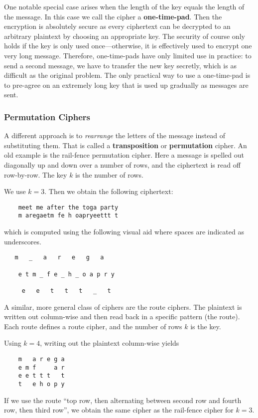 One notable special case arises when the length of the key equals the length of the message.
In this case we call the cipher a \textbf{one-time-pad}.
Then the encryption is absolutely secure as every ciphertext can be decrypted to an arbitrary plaintext by choosing an appropriate key.
The security of course only holds if the key is only used once---otherwise, it is effectively used to encrypt one very long message.
Therefore, one-time-pads have only limited use in practice: to send a second message, we have to transfer the new key secretly, which is as difficult as the original problem.
The only practical way to use a one-time-pad is to pre-agree on an extremely long key that is used up gradually as messages are sent.

\subsubsection{Permutation Ciphers}

A different approach is to \emph{rearrange} the letters of the message instead of substituting them.
That is called a \textbf{transposition} or \textbf{permutation} cipher.
An old example is the rail-fence permutation cipher.
Here a message is spelled out diagonally up and down over a number of rows, and the ciphertext is read off row-by-row.
The key $k$ is the number of rows.

\begin{example}
 We use $k=3$.
 Then we obtain the following ciphertext:
  \begin{lstlisting}
    meet me after the toga party
    m aregaetm fe h oapryeettt t
  \end{lstlisting}
which is computed using the following visual aid where spaces are indicated as underscores.
  \begin{lstlisting}
   m   _   a   r   e   g   a

    e t m _ f e _ h _ o a p r y

     e   e   t   t   t   _   t
  \end{lstlisting}
\end{example}

A similar, more general class of ciphers are the route ciphers.
The plaintext is written out column-wise and then read back in a specific pattern (the route).
Each route defines a route cipher, and the number of rows $k$ is the key.

\begin{example}
Using $k=4$, writing out the plaintext column-wise yields
  \begin{lstlisting}
    m   a r e g a
    e m f     a r
    e e t t t   t
    t   e h o p y
  \end{lstlisting}

If we use the route ``top row, then alternating between second row and fourth row, then third row'', we obtain the same cipher as the rail-fence cipher for $k=3$.
\end{example}

